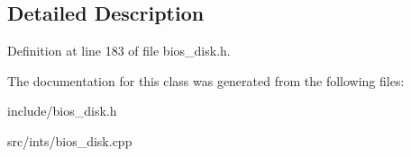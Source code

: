 \subsection{Detailed Description}


Definition at line 183 of file bios\-\_\-disk.\-h.



The documentation for this class was generated from the following files\-:\begin{DoxyCompactItemize}
\item 
include/bios\-\_\-disk.\-h\item 
src/ints/bios\-\_\-disk.\-cpp\end{DoxyCompactItemize}
